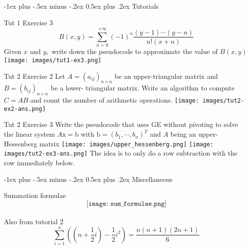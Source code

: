 \documentclass[10pt,landscape]{article}
\makeatletter
\renewcommand{\section}{\@startsection{section}{1}{0mm}%
                                {-1ex plus -.5ex minus -.2ex}%
                                {0.5ex plus .2ex}%
                                {\normalfont\large\bfseries}}
\theoremstyle{definition}
\newcommand{\thistheoremname}{}
\newtheorem*{genericthm*}{\thistheoremname}
\newenvironment{namedthm*}[1]
{\renewcommand{\thistheoremname}{#1}\begin{genericthm*}}
{\end{genericthm*}}
\makeatother
\begin{document}
\begin{multicols}{3}
\section{Tutorials}
\begin{namedthm*}{Tut 1 Exercise 3}
$$B(x, y)=\sum_{n=0}^{+\infty}(-1)^{n} \frac{(y-1) \cdots(y-n)}{n !(x+n)}$$
Given $x$ and $y,$ write down the pseudocode to approximate the value of $B(x, y)$\\
\texttt{[image: images/tut1-ex3.png]}
\end{namedthm*}


\begin{namedthm*}{Tut 2 Exercise 2}
Let $A=\left(a_{i j}\right)_{n \times n}$ be an upper-triangular matrix and $B=\left(b_{i j}\right)_{n \times n}$ be a lower-
triangular matrix. Write an algorithm to compute $C=A B$ and count the number of arithmetic
operations.
\texttt{[image: images/tut2-ex2-ans.png]}
\end{namedthm*}
\begin{namedthm*}{Tut 2 Exercise 3}
Write the pseudocode that uses GE without pivoting to
solve the linear system $A \mathrm{x}=\mathrm{b}$ with $\mathrm{b}=\left(b_{1}, \cdots, b_{n}\right)^{T}$ and $A$ being an upper-Hessenberg matrix
\texttt{[image: images/upper\_hessenberg.png]}
\texttt{[image: images/tut2-ex3-ans.png]} The idea is to only do a row subtraction with the row immediately below.
\end{namedthm*}




\section{Miscellaneous}
\begin{namedthm*}{Summation formulae}
$$\texttt{[image: sum\_formulae.png]}$$
\\Also from tutorial 2
$$\sum_{i=1}^{n}\left(\left(n + \frac{1}{2}i\right)-\frac{1}{2}i^2\right)=\frac{n(n+1)(2n+1)}{6}$$
\end{namedthm*}




\end{multicols}
\end{document}
